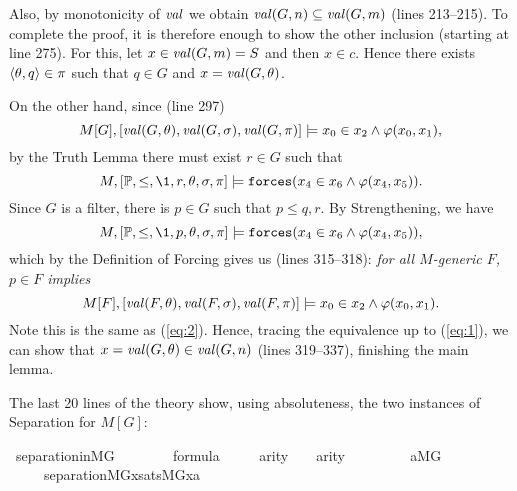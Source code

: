 Also, by monotonicity of $\operatorname{\mathit{val}}$ we obtain 
  $\operatorname{\mathit{val}}(G,n)\subseteq \operatorname{\mathit{val}}(G,m)$ (lines 213--215).
To complete the proof, it is therefore enough to show the other
inclusion (starting at line 275).
For this, let $x\in \operatorname{\mathit{val}}(G,m) = S$ and then $x\in c$. Hence there exists
$\langle\theta,q\rangle\in\pi$ such that $q\in G$ and $x=\operatorname{\mathit{val}}(G,\theta)$. 

On the other hand, since (line 297)
\[
M[G],[\operatorname{\mathit{val}}(G,\theta),\operatorname{\mathit{val}}(G,\sigma),\operatorname{\mathit{val}}(G,\pi)]\models
 x_0\in x_2\wedge\varphi( x_0, x_1),
\]
by the  Truth Lemma there must exist $r\in G$ such that
\[
M,[\PP,\leq,\1,r,\th,\sig,\pi]\models
\forceisa(x_4\in x_6\y\phi( x_4, x_5)).
\]
Since $G$ is a filter, there is $p\in G$ such that $p\leq q, r$.
By Strengthening, we have
\[
M,[\PP,\leq,\1,p,\th,\sig,\pi]\models
\forceisa(x_4\in x_6\y \phi( x_4, x_5)),
\]
which by the Definition of Forcing gives us (lines 315--318): \emph{for all $M$-generic $F$,
  $p\in F$ implies} 
\[
M[F],[\operatorname{\mathit{val}}(F,\theta),\operatorname{\mathit{val}}(F,\sigma),\operatorname{\mathit{val}}(F,\pi)]\models
 x_0\in  x_2 \wedge\varphi( x_0, x_1).
\]
Note this is the same as (\ref{eq:2}). Hence, tracing the equivalence
up to (\ref{eq:1}), we can show that $x=\operatorname{\mathit{val}}(G,\theta)\in \operatorname{\mathit{val}}(G,n)$
(lines 319--337), finishing the main lemma.

The last 20 lines of the theory show, using absoluteness, the two
instances of Separation for $M[G]$:

\begin{isabelle}
\isamarkupfalse%
\ separation{\isacharunderscore}in{\isacharunderscore}MG{\isacharcolon}\isanewline
\ \ \ \isanewline
\ \ \ \ {\isachardoublequoteopen}{\isasymphi}{\isasymin}formula{\isachardoublequoteclose}\ \isanewline
\ \ \ \  {\isachardoublequoteopen}arity{\isacharparenleft}{\isasymphi}{\isacharparenright}\ {\isacharequal}\ {}\ {\isasymor}\ arity{\isacharparenleft}{\isasymphi}{\isacharparenright}{\isacharequal}{}{\isachardoublequoteclose}\isanewline
\ \ \ \ \isanewline
\ \ \ \ {\isachardoublequoteopen}{\isasymforall}a{\isasymin}{\isacharparenleft}M{\isacharbrackleft}G{\isacharbrackright}{\isacharparenright}{\isachardot}\isanewline 
 \ \ \ \ \  separation{\isacharparenleft}{\isacharhash}{\isacharhash}M{\isacharbrackleft}G{\isacharbrackright}{\isacharcomma}{\isasymlambda}x{\isachardot}sats{\isacharparenleft}M{\isacharbrackleft}G{\isacharbrackright}{\isacharcomma}{\isasymphi}{\isacharcomma}{\isacharbrackleft}x{\isacharcomma}a{\isacharbrackright}{\isacharparenright}{\isacharparenright}{\isachardoublequoteclose}
\end{isabelle}
   

